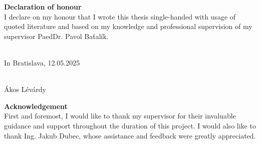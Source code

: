 \documentclass[\myFontSize,a4paper,oneside,hidelinks]{article}
\begin{document}
\titleformat{\section}{\huge\bfseries}{\thesection}{1em}{}
\titleformat{\subsection}{\LARGE\bfseries}{\thesubsection}{1em}{}
\titleformat{\subsubsection}{\Large\bfseries}{\thesubsubsection}{1em}{}

%
%

\newpage{}
\thispagestyle{empty}
\mbox{}




\newpage{}
\thispagestyle{empty}
\mbox{}

\newpage{} 		%
\vspace*{\fill}
\noindent \Large \textbf{Declaration of honour}\\
\noindent I declare on my honour that I wrote this thesis single-handed with usage of quoted literature and based on my knowledge and professional supervision of my supervisor PaedDr. Pavol Baťalík.\\\\

\begin{flushleft}
In Bratislava, 12.05.2025
\end{flushleft}

\begin{flushright}
\underline{\hspace{4cm}}\\\hfill
Ákos Lévárdy
\end{flushright}
\vspace*{\fill} 
\vspace{-8cm} 



\newpage 			%
\vspace*{\fill} 
\noindent \Large \textbf{Acknowledgement}\\
\noindent First and foremost, I would like to thank my supervisor for their invaluable guidance and support throughout the duration of this project. I would also like to thank Ing. Jakub Dubec, whose assistance and feedback were greatly appreciated.
\vspace*{\fill} 
\vspace{-8cm} 
\end{document}
